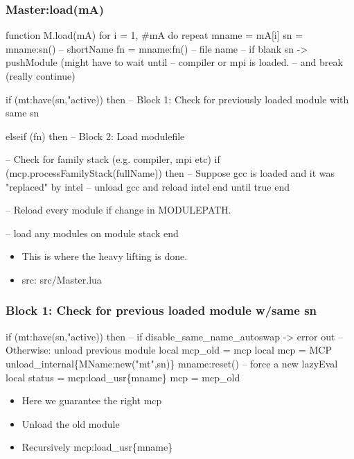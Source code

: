 \documentclass{beamer}
\begin{document}
\begin{frame}[fragile]
    \frametitle{Master:load(mA)}
 {\tiny
    \begin{semiverbatim}
function M.load(mA)
  for i = 1, #mA do
     repeat
        mname = mA[i]
        sn = mname:sn()  -- shortName
        fn = mname:fn()  -- file name
        -- if blank sn -> pushModule (might have to wait until
        -- compiler or mpi is loaded.
        -- and break (really continue)

        if (mt:have(sn,"active)) then
           -- Block 1: Check for previously loaded module with same sn

        elseif (fn) then
           -- Block 2: Load modulefile

        -- Check for family stack (e.g. compiler, mpi etc)
        if (mcp.processFamilyStack(fullName)) then
            -- Suppose gcc is loaded and it was "replaced" by intel
            -- unload gcc and reload intel
         end
      until true
   end         
     
   -- Reload every module if change in MODULEPATH.
     
   -- load any modules on module stack
end
    \end{semiverbatim}
}
  \begin{itemize}
    \item This is where the heavy lifting is done.
    \item src: src/Master.lua
  \end{itemize}

\end{frame}

\begin{frame}[fragile]
    \frametitle{Block 1: Check for previous loaded module w/same sn}
 {\tiny
    \begin{semiverbatim}
 if (mt:have(sn,"active)) then
    -- if disable_same_name_autoswap -> error out
    -- Otherwise: unload previous module
     local mcp_old = mcp
     local mcp     = MCP
     unload_internal\{MName:new("mt",sn)\}
     mname:reset()  -- force a new lazyEval
     local status = mcp:load_usr\{mname\}
     mcp          = mcp_old
    \end{semiverbatim}
}
  \begin{itemize}
    \item Here we guarantee the right mcp
    \item Unload the old module 
    \item Recursively mcp:load\_usr\{mname\}
  \end{itemize}
\end{frame}
\end{document}
